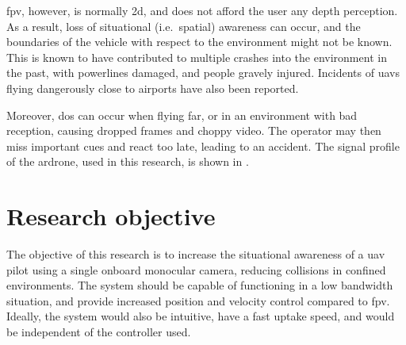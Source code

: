 \gls{fpv}, however, is normally \gls{2d}, and does not afford the user any depth perception.
As a result, loss of situational (i.e.\ spatial) awareness can occur, and the boundaries of the vehicle with respect to the environment might not be known.
This is known to have contributed to multiple crashes into the environment in the past, with powerlines damaged,\cite{latimes2015} and people gravely injured.\cite{seattletimes2015,bbcnews2015}
Incidents of \glspl{uav} flying dangerously close to airports have also been reported.\cite{ctvnews2014}

Moreover, \gls{dos} can occur when flying far, or in an environment with bad reception, causing dropped frames and choppy video.
The operator may then miss important cues and react too late, leading to an accident.
The signal profile of the \gls{ardrone}, used in this research, is shown in .

\section{Research objective}
The objective of this research is to increase the situational awareness of a \gls{uav} pilot using a single onboard monocular camera, reducing collisions in confined environments.
The system should be capable of functioning in a low bandwidth situation, and provide increased position and velocity control compared to \gls{fpv}.
Ideally, the system would also be intuitive, have a fast uptake speed, and would be independent of the controller used.
